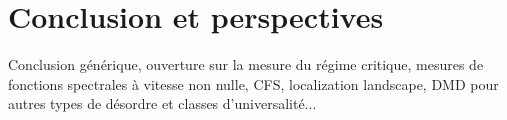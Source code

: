 \makeatletter
\def\toclevel@chapter{-1}
\makeatother

\chapter*{Conclusion et perspectives}

Conclusion générique, ouverture sur la mesure du régime critique, mesures de fonctions spectrales à vitesse non nulle, CFS, localization landscape, DMD pour autres types de désordre et classes d'universalité...


\makeatletter
\def\toclevel@chapter{0}
\makeatother
